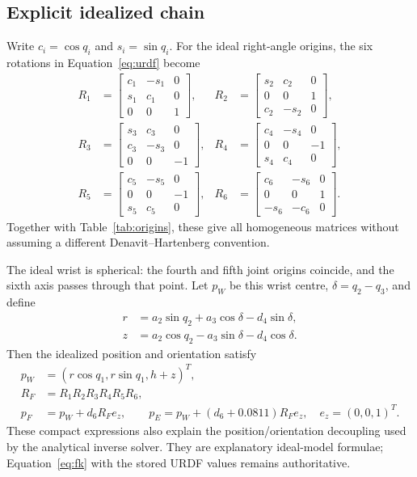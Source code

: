 \documentclass[11pt,a4paper]{report}
\begin{document}
\subsection{Explicit idealized chain}
Write $c_i=\cos q_i$ and $s_i=\sin q_i$. For the ideal right-angle origins,
the six rotations in Equation~\eqref{eq:urdf} become
\begin{align}
 R_1&=\begin{bmatrix}c_1&-s_1&0\\s_1&c_1&0\\0&0&1\end{bmatrix},&
 R_2&=\begin{bmatrix}s_2&c_2&0\\0&0&1\\c_2&-s_2&0\end{bmatrix},\\
 R_3&=\begin{bmatrix}s_3&c_3&0\\c_3&-s_3&0\\0&0&-1\end{bmatrix},&
 R_4&=\begin{bmatrix}c_4&-s_4&0\\0&0&-1\\s_4&c_4&0\end{bmatrix},\\
 R_5&=\begin{bmatrix}c_5&-s_5&0\\0&0&-1\\s_5&c_5&0\end{bmatrix},&
 R_6&=\begin{bmatrix}c_6&-s_6&0\\0&0&1\\-s_6&-c_6&0\end{bmatrix}.
\end{align}
Together with Table~\ref{tab:origins}, these give all homogeneous matrices
without assuming a different Denavit--Hartenberg convention.

The ideal wrist is spherical: the fourth and fifth joint origins coincide,
and the sixth axis passes through that point. Let $p_W$ be this wrist centre,
$\delta=q_2-q_3$, and define
\begin{align}
 r&=a_2\sin q_2+a_3\cos\delta-d_4\sin\delta,\\
 z&=a_2\cos q_2-a_3\sin\delta-d_4\cos\delta.
\end{align}
Then the idealized position and orientation satisfy
\begin{align}
 p_W&=(r\cos q_1,r\sin q_1,h+z)^T,\\
 R_F&=R_1R_2R_3R_4R_5R_6,\\
 p_F&=p_W+d_6R_Fe_z,\qquad
 p_E=p_W+(d_6+0.0811)R_Fe_z,
 \quad e_z=(0,0,1)^T.
 \label{eq:position}
\end{align}
These compact expressions also explain the position/orientation decoupling
used by the analytical inverse solver. They are explanatory ideal-model
formulae; Equation~\eqref{eq:fk} with the stored URDF values remains authoritative.
\end{document}
